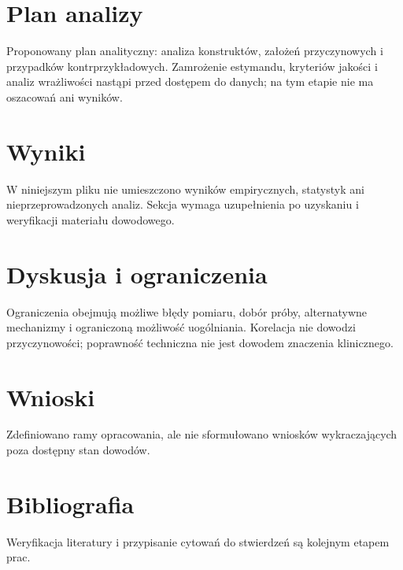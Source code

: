 \documentclass[11pt,a4paper]{article}
\begin{document}
\section{Plan analizy}

Proponowany plan analityczny: analiza konstruktów, założeń przyczynowych i przypadków kontrprzykładowych. Zamrożenie estymandu, kryteriów jakości i analiz wrażliwości nastąpi przed dostępem do danych; na tym etapie nie ma oszacowań ani wyników.

\section{Wyniki}

W niniejszym pliku nie umieszczono wyników empirycznych, statystyk ani nieprzeprowadzonych analiz. Sekcja wymaga uzupełnienia po uzyskaniu i weryfikacji materiału dowodowego.

\section{Dyskusja i ograniczenia}

Ograniczenia obejmują możliwe błędy pomiaru, dobór próby, alternatywne mechanizmy i ograniczoną możliwość uogólniania. Korelacja nie dowodzi przyczynowości; poprawność techniczna nie jest dowodem znaczenia klinicznego.

\section{Wnioski}

Zdefiniowano ramy opracowania, ale nie sformułowano wniosków wykraczających poza dostępny stan dowodów.

\section*{Bibliografia}

Weryfikacja literatury i przypisanie cytowań do stwierdzeń są kolejnym etapem prac.
\end{document}

